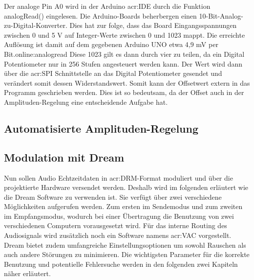 Der analoge Pin A0 wird in der Arduino \gls{acr:IDE} durch die Funktion analogRead() eingelesen. Die Arduino-Boards beherbergen einen 10-Bit-Analog-zu-Digital-Konverter. Dies hat zur folge, dass das Board Eingangsspannungen zwischen 0 und 5 V auf Integer-Werte zwischen 0 und 1023 mappt. Die erreichte Auflösung ist damit auf dem gegebenen Arduino UNO etwa 4,9 mV per Bit.\gls{online:analogread} Diese 1023 gilt es dann durch vier zu teilen, da ein Digital Potentiometer nur in 256 Stufen angesteuert werden kann. Der Wert wird dann über die \gls{acr:SPI} Schnittstelle an das Digital Potentiometer gesendet und verändert somit dessen Widerstandswert. Somit kann der Offsetwert extern in das Programm geschrieben werden. Dies ist so bedeutsam, da der Offset auch in der Amplituden-Regelung eine entscheidende Aufgabe hat. 
\newpage
\subsection{Automatisierte Amplituden-Regelung}
\label{subsec:autoamp}







\newpage
\subsection{Modulation mit Dream}
\label{subsec:dream}
Nun sollen Audio Echtzeitdaten in \gls{acr:DRM}-Format moduliert und über die projektierte Hardware versendet werden. Deshalb wird im folgenden erläutert wie die Dream Software zu verwenden ist. Sie verfügt über zwei verschiedene Möglichkeiten aufgerufen werden. Zum ersten im Sendemodus und zum zweiten im Empfangsmodus, wodurch bei einer Übertragung die Benutzung von zwei verschiedenen Computern vorausgesetzt wird. Für das interne Routing des Audiosignals wird zusätzlich noch ein Software namens \gls{acr:VAC} vorgestellt. Dream bietet zudem umfangreiche Einstellungsoptionen um sowohl Rauschen als auch andere Störungen zu minimieren. Die wichtigsten Parameter für die korrekte Benutzung und potentielle Fehlersuche werden in den folgenden zwei Kapiteln näher erläutert.

